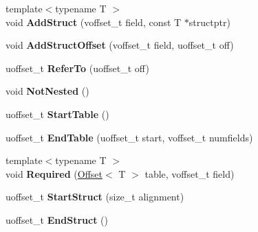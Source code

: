 \begin{DoxyCompactItemize}
{\footnotesize template$<$typename T $>$ }\\void {\bfseries Add\+Struct} (voffset\+\_\+t field, const T $\ast$structptr)
\item 
\mbox{\label{classflatbuffers_1_1FlatBufferBuilder_a9de51fe44c441c9ea85fcfd51dc5b33b}} 
void {\bfseries Add\+Struct\+Offset} (voffset\+\_\+t field, uoffset\+\_\+t off)
\item 
\mbox{\label{classflatbuffers_1_1FlatBufferBuilder_a62999f8123570f017857ec4bbd513f2a}} 
uoffset\+\_\+t {\bfseries Refer\+To} (uoffset\+\_\+t off)
\item 
\mbox{\label{classflatbuffers_1_1FlatBufferBuilder_aacf8e58f3dfd2f838352b39ee71c5304}} 
void {\bfseries Not\+Nested} ()
\item 
\mbox{\label{classflatbuffers_1_1FlatBufferBuilder_a2a049ecb11945705285786f3d1841d80}} 
uoffset\+\_\+t {\bfseries Start\+Table} ()
\item 
\mbox{\label{classflatbuffers_1_1FlatBufferBuilder_adc1ed2c5b32742b04b2417ba7ae1a877}} 
uoffset\+\_\+t {\bfseries End\+Table} (uoffset\+\_\+t start, voffset\+\_\+t numfields)
\item 
\mbox{\label{classflatbuffers_1_1FlatBufferBuilder_a0f38735d32e2b331740a90f456083699}} 
{\footnotesize template$<$typename T $>$ }\\void {\bfseries Required} (\hyperlink{structflatbuffers_1_1Offset}{Offset}$<$ T $>$ table, voffset\+\_\+t field)
\item 
\mbox{\label{classflatbuffers_1_1FlatBufferBuilder_a3ac0bf8d0486cf76408d12e973381b23}} 
uoffset\+\_\+t {\bfseries Start\+Struct} (size\+\_\+t alignment)
\item 
\mbox{\label{classflatbuffers_1_1FlatBufferBuilder_afbf85c5f68c115eadfd1ba021f609657}} 
uoffset\+\_\+t {\bfseries End\+Struct} ()
\item 
\mbox{\label{classflatbuffers_1_1FlatBufferBuilder_a6c1703607d0b9f41e2a7a0d0f91ae9ec}} 

\end{DoxyCompactItemize}
